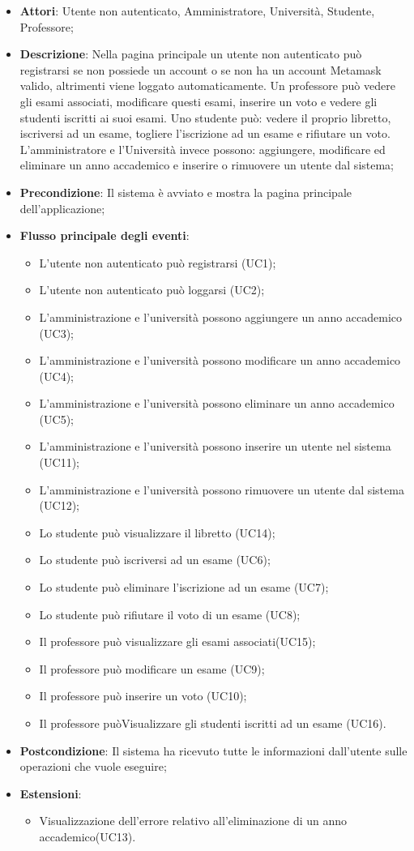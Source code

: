\begin{itemize}
	\item \textbf{Attori}: Utente non autenticato, Amministratore, Università, Studente, Professore;
	\item \textbf{Descrizione}: Nella pagina principale un utente non autenticato può registrarsi se non possiede un account o se non ha un account Metamask valido, altrimenti viene loggato automaticamente.
	Un professore può vedere gli esami associati, modificare questi esami, inserire un voto e vedere gli studenti iscritti ai suoi esami.
	Uno studente può: vedere il proprio libretto, iscriversi ad un esame, togliere l'iscrizione ad un esame e rifiutare un voto.
	L'amministratore e l'Università invece possono: aggiungere, modificare ed eliminare un anno accademico e inserire o rimuovere un utente dal sistema;
	\item \textbf{Precondizione}: Il sistema è avviato e mostra la pagina principale dell'applicazione;
	\item \textbf{Flusso principale degli eventi}: 
	\begin{itemize}
		\item L'utente non autenticato può registrarsi (UC1);
		\item L'utente non autenticato può loggarsi (UC2);
		\item L'amministrazione e l'università possono aggiungere un anno accademico (UC3);
		\item L'amministrazione e l'università possono modificare un anno accademico (UC4);
		\item L'amministrazione e l'università possono eliminare un anno accademico (UC5);
		\item L'amministrazione e l'università possono inserire un utente nel sistema (UC11);
		\item L'amministrazione e l'università possono rimuovere un utente dal sistema (UC12);
		\item Lo studente può visualizzare il libretto (UC14);
		\item Lo studente può iscriversi ad un esame (UC6);
		\item Lo studente può eliminare l'iscrizione ad un esame (UC7);
		\item Lo studente può rifiutare il voto di un esame (UC8);
		\item Il professore può visualizzare gli esami associati(UC15);
		\item Il professore può modificare un esame (UC9);
		\item Il professore può inserire un voto (UC10);
		\item Il professore puòVisualizzare gli studenti iscritti ad un esame (UC16).
	\end{itemize}
	\item \textbf{Postcondizione}: Il sistema ha ricevuto tutte le informazioni dall’utente sulle operazioni che vuole eseguire;
	\item \textbf{Estensioni}:
	\begin{itemize}
		\item Visualizzazione dell'errore relativo all'eliminazione di un anno accademico(UC13).
	\end{itemize}
\end{itemize}
